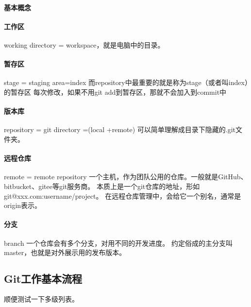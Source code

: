\documentclass[../Main/thesis]{subfiles}
\begin{document}
\paragraph{基本概念} \label{par:git-concept}

\paragraph{工作区}
working directory = workspace，就是电脑中的目录。

\paragraph{暂存区}
stage = staging area=index
而repository中最重要的就是称为stage（或者叫index）的暂存区
每次修改，如果不用git add到暂存区，那就不会加入到commit中

\paragraph{版本库}
repository = git directory =(local +remote)
可以简单理解成目录下隐藏的.git文件夹。

\paragraph{远程仓库}
remote = remote repository
一个主机，作为团队公用的仓库。一般就是GitHub、bitbucket、gitee等git服务商。
本质上是一个git仓库的地址，形如 git@xxx.com:username/project。
在远程仓库管理中，会给它一个别名，通常是origin表示。

\paragraph{分支}
branch
一个仓库会有多个分支，对用不同的开发进度。
约定俗成的主分支叫master，也就是对外展示用的发布版本。

\subsection{Git工作基本流程} \label{ssc:git-workflow}

顺便测试一下多级列表。
\end{document}
